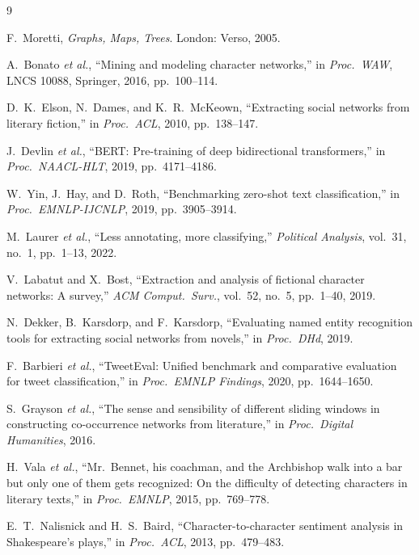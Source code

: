 \documentclass[a4paper]{article}
\begin{document}
\begin{thebibliography}{9}

F.\ Moretti,
\textit{Graphs, Maps, Trees}.
London: Verso, 2005.

A.\ Bonato \textit{et al.},
``Mining and modeling character networks,''
in \textit{Proc.\ WAW}, LNCS 10088, Springer, 2016, pp.~100--114.

D.\ K.\ Elson, N.\ Dames, and K.\ R.\ McKeown,
``Extracting social networks from literary fiction,''
in \textit{Proc.\ ACL}, 2010, pp.~138--147.


J.\ Devlin \textit{et al.},
``BERT: Pre-training of deep bidirectional transformers,''
in \textit{Proc.\ NAACL-HLT}, 2019, pp.~4171--4186.

W.\ Yin, J.\ Hay, and D.\ Roth,
``Benchmarking zero-shot text classification,''
in \textit{Proc.\ EMNLP-IJCNLP}, 2019, pp.~3905--3914.

M.\ Laurer \textit{et al.},
``Less annotating, more classifying,''
\textit{Political Analysis}, vol.~31, no.~1, pp.~1--13, 2022.


V.\ Labatut and X.\ Bost,
``Extraction and analysis of fictional character networks: A survey,''
\textit{ACM Comput.\ Surv.}, vol.~52, no.~5, pp.~1--40, 2019.

N.\ Dekker, B.\ Karsdorp, and F.\ Karsdorp,
``Evaluating named entity recognition tools for extracting social networks from novels,''
in \textit{Proc.\ DHd}, 2019.

F.\ Barbieri \textit{et al.},
``TweetEval: Unified benchmark and comparative evaluation for tweet classification,''
in \textit{Proc.\ EMNLP Findings}, 2020, pp.~1644--1650.

S.\ Grayson \textit{et al.},
``The sense and sensibility of different sliding windows in constructing
co-occurrence networks from literature,''
in \textit{Proc.\ Digital Humanities}, 2016.

H.\ Vala \textit{et al.},
``Mr.\ Bennet, his coachman, and the Archbishop walk into a bar but only
one of them gets recognized: On the difficulty of detecting characters
in literary texts,''
in \textit{Proc.\ EMNLP}, 2015, pp.~769--778.


E.\ T.\ Nalisnick and H.\ S.\ Baird,
``Character-to-character sentiment analysis in Shakespeare's plays,''
in \textit{Proc.\ ACL}, 2013, pp.~479--483.


\end{thebibliography}
\end{document}

